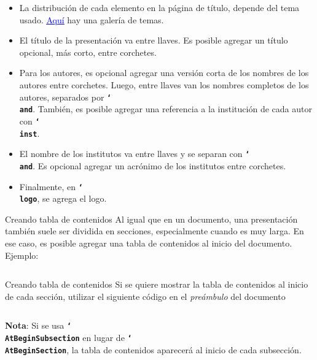 \documentclass{beamer}
\newcommand{\bftt}[1]{\textbf{\texttt{#1}}}
\newcommand{\cmd}[1]{{\color{mygreen}\bftt{#1}}}
\newcommand{\bs}{\char`\\}
\newcommand{\cmdbs}[1]{\cmd{\bs#1}}
\begin{document}
    \begin{frame}
        \begin{itemize}
            \justifying
            \item La distribución de cada elemento en la página de título, depende del tema usado. \href{https://hartwork.org/beamer-theme-matrix/}{\textcolor{blue}{\underline{Aquí}}} hay una galería de temas.
            \item El título de la presentación va entre llaves. Es posible agregar un título opcional, más corto, entre corchetes.
            \item Para los autores, es opcional agregar una versión corta de los nombres de los autores entre corchetes. Luego, entre llaves van los nombres completos de los autores, separados por \cmdbs{and}. También, es posible agregar una referencia a la institución de cada autor con \cmdbs{inst}.
            \item El nombre de los institutos va entre llaves y se separan con \cmdbs{and}. Es opcional agregar un acrónimo de los institutos entre corchetes.
            \item Finalmente, en \cmdbs{logo}, se agrega el logo.
        \end{itemize}
    \end{frame}

    \begin{frame}{Creando tabla de contenidos}
        \justifying
        Al igual que en un documento, una presentación también suele ser dividida en secciones, especialmente cuando es muy larga. En ese caso, es posible agregar una tabla de contenidos al inicio del documento. Ejemplo:
        \begin{center}
            \begin{minipage}{0.45\linewidth}
                \inputminted[fontsize=\scriptsize, frame=single]{latex}{contents_frame.tex}
            \end{minipage}
        \end{center}
    \end{frame}

    \begin{frame}{Creando tabla de contenidos}
        \justifying
        Si se quiere mostrar la tabla de contenidos al inicio de cada sección, utilizar el siguiente código en el \textsl{preámbulo} del documento
        \begin{center}
            \begin{minipage}{0.52\linewidth}
                \inputminted[fontsize=\scriptsize, frame=single]{latex}{contents_frame2.tex}
            \end{minipage}
        \end{center}
        \textbf{Nota}: Si se usa \cmdbs{AtBeginSubsection} en lugar de \cmdbs{AtBeginSection}, la tabla de contenidos aparecerá al inicio de cada subsección.
    \end{frame}
\end{document}
